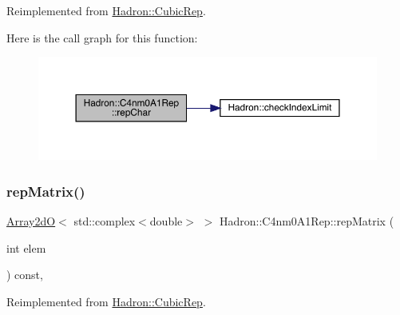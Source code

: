 Reimplemented from \mbox{\hyperlink{structHadron_1_1CubicRep_af45227106e8e715e84b0af69cd3b36f8}{Hadron\+::\+Cubic\+Rep}}.

Here is the call graph for this function\+:
\nopagebreak
\begin{figure}[H]
\begin{center}
\leavevmode
\includegraphics[width=350pt]{d8/d28/structHadron_1_1C4nm0A1Rep_ac54e244df5f9d7618d3033c48a7fb020_cgraph}
\end{center}
\end{figure}
\mbox{\label{structHadron_1_1C4nm0A1Rep_a18af771ed96478090f052459dd7a70da}} 
\subsubsection{\texorpdfstring{repMatrix()}{repMatrix()}\hspace{0.1cm}{\footnotesize\ttfamily [1/3]}}
{\footnotesize\ttfamily \mbox{\hyperlink{classADAT_1_1Array2dO}{Array2dO}}$<$ std\+::complex$<$double$>$ $>$ Hadron\+::\+C4nm0\+A1\+Rep\+::rep\+Matrix (\begin{DoxyParamCaption}\item[{int}]{elem }\end{DoxyParamCaption}) const\hspace{0.3cm}{\ttfamily [inline]}, {\ttfamily [virtual]}}



Reimplemented from \mbox{\hyperlink{structHadron_1_1CubicRep_ac5d7e9e6f4ab1158b5fce3e4ad9e8005}{Hadron\+::\+Cubic\+Rep}}.

